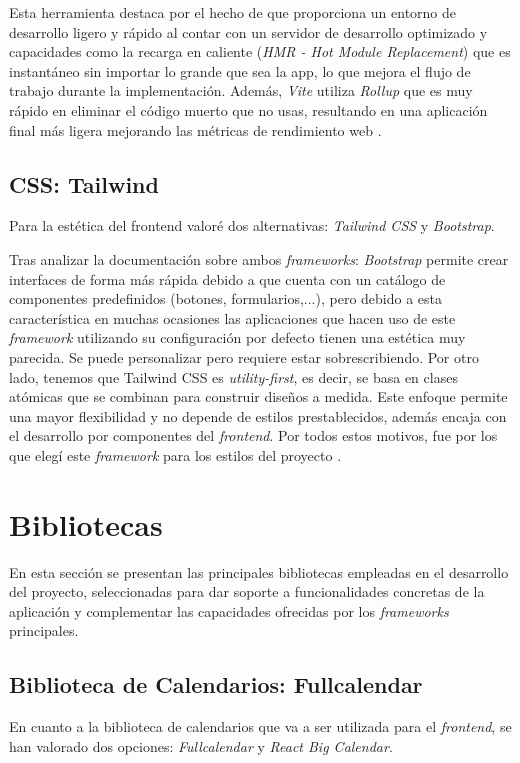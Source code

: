 Esta herramienta destaca por el hecho de que proporciona un entorno de desarrollo ligero y rápido al contar con un servidor de desarrollo optimizado y capacidades como la recarga en caliente (\textit{HMR - Hot Module Replacement}) que es instantáneo sin importar lo grande que sea la app, lo que mejora el flujo de trabajo durante la implementación. Además, \textit{Vite} utiliza \textit{Rollup} que es muy rápido en eliminar el código muerto que no usas, resultando en una aplicación final más ligera mejorando las métricas de rendimiento web \cite{vite}.

\subsection{CSS: Tailwind}

Para la estética del frontend valoré dos alternativas: \textit{Tailwind CSS} y \textit{Bootstrap}.

Tras analizar la documentación sobre ambos \textit{frameworks}: \textit{Bootstrap} permite crear interfaces de forma más rápida debido a que cuenta con un catálogo de componentes predefinidos (botones, formularios,...), pero debido a esta característica en muchas ocasiones las aplicaciones que hacen uso de este \textit{framework} utilizando su configuración por defecto tienen una estética muy parecida. Se puede personalizar pero requiere estar sobrescribiendo.
Por otro lado, tenemos que Tailwind CSS es \textit{utility-first}, es decir, se basa en clases atómicas que se combinan para construir diseños a medida. Este enfoque permite una mayor flexibilidad y no depende de estilos prestablecidos, además encaja con el desarrollo por componentes del \textit{frontend}. Por todos estos motivos, fue por los que elegí este \textit{framework} para los estilos del proyecto \cite{tailwind:bootstrap}.

\section{Bibliotecas}

En esta sección se presentan las principales bibliotecas empleadas en el desarrollo del proyecto, seleccionadas para dar soporte a funcionalidades concretas de la aplicación y complementar las capacidades ofrecidas por los \textit{frameworks} principales.

\subsection{Biblioteca de Calendarios: Fullcalendar}
En cuanto a la biblioteca de calendarios que va a ser utilizada para el \textit{frontend}, se han valorado dos opciones: \textit{Fullcalendar} y \textit{React Big Calendar}.

